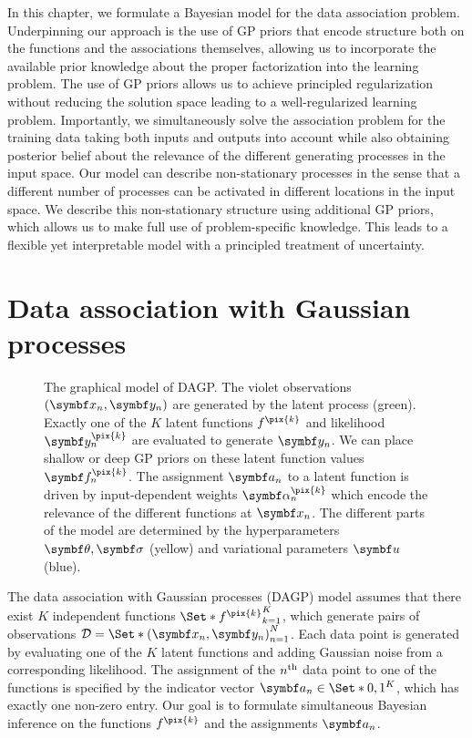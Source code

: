 In this chapter, we formulate a Bayesian model for the data association problem.
Underpinning our approach is the use of GP priors that encode structure both on the functions and the associations themselves, allowing us to incorporate the available prior knowledge about the proper factorization into the learning problem.
The use of GP priors allows us to achieve principled regularization without reducing the solution space leading to a well-regularized learning problem.
Importantly, we simultaneously solve the association problem for the training data taking both inputs and outputs into account while also obtaining posterior belief about the relevance of the different generating processes in the input space.
Our model can describe non-stationary processes in the sense that a different number of processes can be activated in different locations in the input space.
We describe this non-stationary structure using additional GP priors, which allows us to make full use of problem-specific knowledge.
This leads to a flexible yet interpretable model with a principled treatment of uncertainty.

\section{Data association with Gaussian processes}
\label{toc:data_association:model}
\begin{figure}[t]
    \centering
    
    \caption[DAGP graphical model]{
    \label{fig:data_association:data_association_graphical_model}
    The graphical model of DAGP.
    The violet observations $(\mat{x}_n, \mat{y}_n)$ are generated by the latent process (green).
    Exactly one of the $K$ latent functions $f^{\pix{k}}$ and likelihood $\mat{y}_n^{\pix{k}}$ are evaluated to generate $\mat{y}_n$.
    We can place shallow or deep GP priors on these latent function values $\mat{f}_n^{\pix{k}}$.
    The assignment $\mat{a}_n$ to a latent function is driven by input-dependent weights $\mat{\alpha}_n^{\pix{k}}$ which encode the relevance of the different functions at $\mat{x}_n$.
    The different parts of the model are determined by the hyperparameters $\mat{\theta}, \mat{\sigma}$ (yellow) and variational parameters $\mat{u}$ (blue).
    }
\end{figure}
The data association with Gaussian processes (DAGP) model assumes that there exist $K$ independent functions $\Set*{f^{\pix{k}}}_{k=1}^K$, which generate pairs of observations $\Dc = \Set*{(\mat{x}_n, \mat{y}_n)}_{n=1}^N$.
Each data point is generated by evaluating one of the $K$ latent functions and adding Gaussian noise from a corresponding likelihood.
The assignment of the $n^{\text{th}}$ data point to one of the functions is specified by the indicator vector $\mat{a}_n \in \Set*{0, 1}^K$, which has exactly one non-zero entry.
Our goal is to formulate simultaneous Bayesian inference on the functions $f^{\pix{k}}$ and the assignments $\mat{a}_n$.

